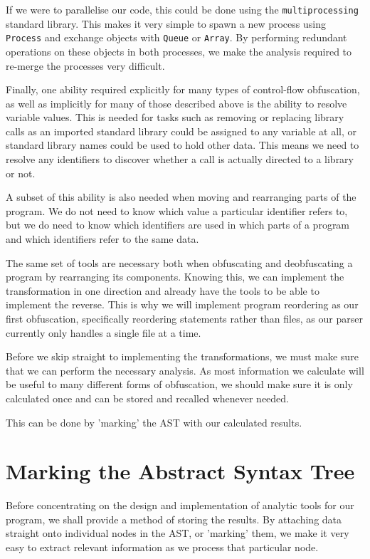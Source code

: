 \documentclass[twoside,a4paper]{report}
\begin{document}
If we were to parallelise our code, this could be done using the \texttt{multiprocessing} standard library. This makes it
very simple to spawn a new process using \texttt{Process} and exchange objects with \texttt{Queue} or \texttt{Array}. By
performing redundant operations on these objects in both processes, we make the analysis required to re-merge the processes
very difficult.

Finally, one ability required explicitly for many types of control-flow obfuscation, as well as implicitly for many of those
described above is the ability to resolve variable values. This is needed for tasks such as removing or replacing library calls
as an imported standard library could be assigned to any variable at all, or standard library names could be used to hold other
data. This means we need to resolve any identifiers to discover whether a call is actually directed to a library or not.

A subset of this ability is also needed when moving and rearranging parts of the program. We do not need to know which value a
particular identifier refers to, but we do need to know which identifiers are used in which parts of a program and which
identifiers refer to the same data.

The same set of tools are necessary both when obfuscating and deobfuscating a program by rearranging its components. Knowing
this, we can implement the transformation in one direction and already have the tools to be able to implement the reverse.
This is why we will implement program reordering as our first obfuscation, specifically reordering statements rather than
files, as our parser currently only handles a single file at a time.

Before we skip straight to implementing the transformations, we must make sure that we can perform the necessary analysis. As
most information we calculate will be useful to many different forms of obfuscation, we should make sure it is only calculated
once and can be stored and recalled whenever needed.

This can be done by 'marking' the AST with our calculated results.

\section{Marking the Abstract Syntax Tree}

Before concentrating on the design and implementation of analytic tools for our program, we shall provide a method of storing
the results. By attaching data straight onto individual nodes in the AST, or 'marking' them, we make it very easy to extract
relevant information as we process that particular node.
\end{document}
